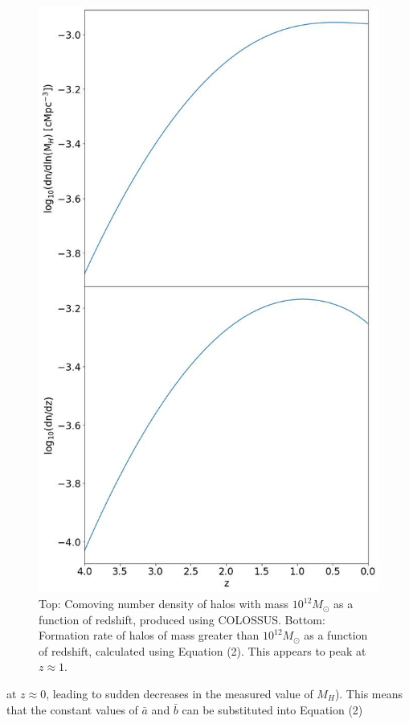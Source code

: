 \documentclass[12pt]{article}%
\begin{document}
\begin{figure}[H]
\centering
\includegraphics[width=12.5cm]{Plot_6.jpeg}
\caption{Top: Comoving number density of halos with mass $10^{12}M_\odot$ as a function of redshift, produced using COLOSSUS. Bottom: Formation rate of halos of mass greater than $10^{12}M_\odot$ as a function of redshift, calculated using Equation (2). This appears to peak at $z\approx1$.}
\label{fig:6}
\end{figure}
\newpage
\twocolumngrid


\noindent at $z\approx0$, leading to  sudden decreases in the measured value of $M_H$). This means that the constant values of $\bar a$ and $\bar b$ can be substituted into Equation (2)
\end{document}
